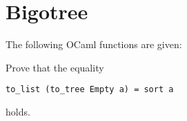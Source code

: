 \section{Bigotree}
The following OCaml functions are given:

Prove that the equality
\begin{center}
    \begin{lstlisting}
to_list (to_tree Empty a) = sort a\end{lstlisting}
\end{center}
holds.